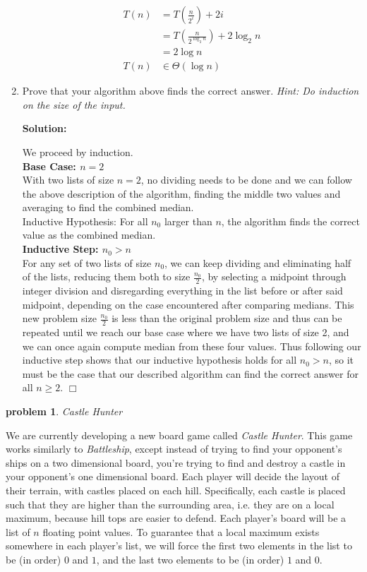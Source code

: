 \documentclass[10pt]{article}
\newenvironment{proof}{\par\noindent{\it Proof.}\hspace*{1em}}{$\Box$\bigskip}
\newtheorem{problem}{\sc\color{cit}problem}
\begin{document}
\begin{enumerate}
    	\begin{align*}
    	T(n) &= T(\frac{n}{2^i}) + 2i \\
    	&= T(\frac{n}{2^{\log_2n}}) + 2{\log_2n} \\
    	&= 2\log n  \\
    	T(n) &\in \Theta(\log n)
    	\end{align*}
    
    \item Prove that your algorithm above finds the correct answer. \emph{Hint: Do induction on the size of the input.}
    
    \textbf{Solution: }
    
    \begin{proof}
    We proceed by induction. \\
    \textbf{Base Case: $n = 2$} \\
    With two lists of size $n = 2$, no dividing needs to be done and we can follow the above description of the algorithm, finding the middle two values and averaging to find the combined median. \\
    Inductive Hypothesis: For all $n_0$ larger than $n$, the algorithm finds the correct value as the combined median.   \\
    \textbf{Inductive Step: $n_0 > n$}\\
    For any set of two lists of size $n_0$, we can keep dividing and eliminating half of the lists, reducing them both to size $\frac{n_0}{2}$, by selecting a midpoint through integer division and disregarding everything in the list before or after said midpoint, depending on the case encountered after comparing medians. This new problem size $\frac{n_0}{2}$ is less than the original problem size and thus can be repeated until we reach our base case where we have two lists of size 2, and we can once again compute median from these four values. Thus following our inductive step shows that our inductive hypothesis holds for all $n_0 > n$, so it must be the case that our described algorithm can find the correct answer for all $n \geq 2.$
    \end{proof}
    
\end{enumerate}

\begin{problem}Castle Hunter\end{problem}

We are currently developing a new board game called \textit{Castle Hunter}. This game works similarly to \textit{Battleship}, except instead of trying to find your opponent's ships on a two dimensional board, you're trying to find and destroy a castle in your opponent's one dimensional board.  Each player will decide the layout of their terrain, with castles placed on each hill.  Specifically, each castle is placed such that they are higher than the surrounding area, i.e. they are on a local maximum, because hill tops are easier to defend.  Each player's board will be a list of $n$ floating point values. To guarantee that a local maximum exists somewhere in each player's list, we will force the first two elements in the list to be (in order) $0$ and $1$, and the last two elements to be (in order) $1$ and $0$. 
\end{document}
